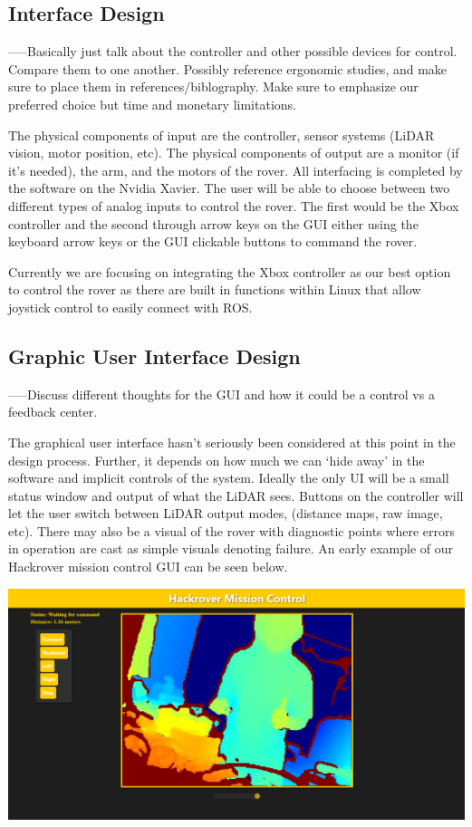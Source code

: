 \documentclass[a4paper, 10pt]{article}
\begin{document}
	\subsection{Interface Design}
	-----Basically just talk about the controller and other possible devices for control. Compare them to one another. Possibly reference ergonomic studies, and make sure to place them in references/biblography. Make sure to emphasize our preferred choice but time and monetary limitations.
	
	The physical components of input are the controller, sensor systems (LiDAR vision, motor position, etc). The physical components of output are a monitor (if it’s needed), the arm, and the motors of the rover. All interfacing is completed by the software on the Nvidia Xavier. 
The user will be able to choose between two different types of analog inputs to control the rover. The first would be the Xbox controller and the second through arrow keys on the GUI either using the keyboard arrow keys or the GUI clickable buttons to command the rover.

Currently we are focusing on integrating the Xbox controller as our best option to control the rover as there are built in functions within Linux that allow joystick control to easily connect with ROS. 


	\subsection{Graphic User Interface Design}
	-----Discuss different thoughts for the GUI and how it could be a control vs a feedback center.
	
	The graphical user interface hasn’t seriously been considered at this point in the design process. Further, it depends on how much we can ‘hide away’ in the software and implicit controls of the system. Ideally the only UI will be a small status window and output of what the LiDAR sees. Buttons on the controller will let the user switch between LiDAR output modes, (distance maps, raw image, etc). There may also be a visual of the rover with diagnostic points where errors in operation are cast as simple visuals denoting failure. An early example of our Hackrover mission control GUI can be seen below.
	
\includegraphics[scale=0.25]{hackrover mission control}
\end{document}

